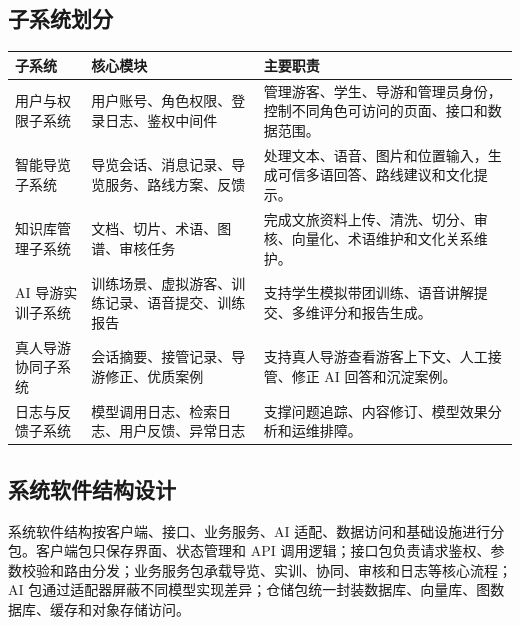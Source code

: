 \subsection{子系统划分}

\begin{longtable}{p{2.6cm}p{4.2cm}p{6.2cm}}
\toprule
子系统 & 核心模块 & 主要职责 \\
\midrule
用户与权限子系统 & 用户账号、角色权限、登录日志、鉴权中间件 & 管理游客、学生、导游和管理员身份，控制不同角色可访问的页面、接口和数据范围。 \\
智能导览子系统 & 导览会话、消息记录、导览服务、路线方案、反馈 & 处理文本、语音、图片和位置输入，生成可信多语回答、路线建议和文化提示。 \\
知识库管理子系统 & 文档、切片、术语、图谱、审核任务 & 完成文旅资料上传、清洗、切分、审核、向量化、术语维护和文化关系维护。 \\
AI 导游实训子系统 & 训练场景、虚拟游客、训练记录、语音提交、训练报告 & 支持学生模拟带团训练、语音讲解提交、多维评分和报告生成。 \\
真人导游协同子系统 & 会话摘要、接管记录、导游修正、优质案例 & 支持真人导游查看游客上下文、人工接管、修正 AI 回答和沉淀案例。 \\
日志与反馈子系统 & 模型调用日志、检索日志、用户反馈、异常日志 & 支撑问题追踪、内容修订、模型效果分析和运维排障。 \\
\bottomrule
\end{longtable}

\subsection{系统软件结构设计}

系统软件结构按客户端、接口、业务服务、AI 适配、数据访问和基础设施进行分包。客户端包只保存界面、状态管理和 API 调用逻辑；接口包负责请求鉴权、参数校验和路由分发；业务服务包承载导览、实训、协同、审核和日志等核心流程；AI 包通过适配器屏蔽不同模型实现差异；仓储包统一封装数据库、向量库、图数据库、缓存和对象存储访问。



